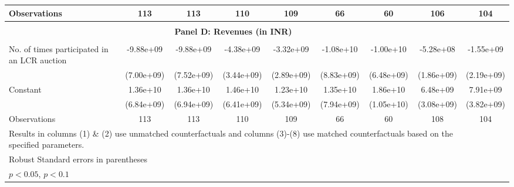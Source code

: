 \begin{table}[htbp]
\begin{tabular}{l*{8}{c}}
\hline
Observations        &         113         &         113         &         110         &         109         &          66         &          60         &         106         &         104         \\
\hline \\ \multicolumn{8}{c}{\textbf{Panel D: Revenues (in INR)}} \\\\[-1ex]
No. of times participated in an LCR auction&   -9.88e+09         &   -9.88e+09         &   -4.38e+09         &   -3.32e+09         &   -1.08e+10         &   -1.00e+10         &   -5.28e+08         &   -1.55e+09         \\
                    &  (7.00e+09)         &  (7.52e+09)         &  (3.44e+09)         &  (2.89e+09)         &  (8.83e+09)         &  (6.48e+09)         &  (1.86e+09)         &  (2.19e+09)         \\
[1em]
Constant            &    1.36e+10\sym{**} &    1.36e+10\sym{*}  &    1.46e+10\sym{**} &    1.23e+10\sym{**} &    1.35e+10\sym{*}  &    1.86e+10\sym{*}  &    6.48e+09\sym{**} &    7.91e+09\sym{**} \\
                    &  (6.84e+09)         &  (6.94e+09)         &  (6.41e+09)         &  (5.34e+09)         &  (7.94e+09)         &  (1.05e+10)         &  (3.08e+09)         &  (3.82e+09)         \\
\hline
Observations        &         113         &         113         &         110         &         109         &          66         &          60         &         108         &         104         \\
\hline\hline\hline \multicolumn{8}{l}{\footnotesize Results in columns (1) \& (2) use unmatched counterfactuals and columns (3)-(8) use matched counterfactuals based on the specified parameters. }\\\multicolumn{5}{l}{\footnotesize Robust Standard errors in parentheses}\\\multicolumn{2}{l}{\footnotesize \sym{**} \(p<0.05\), \sym{*} \(p<0.1\)}\\ \end{tabular} \\ \end{table}
